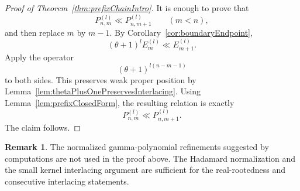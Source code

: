 \documentclass[reqno]{amsart}
\numberwithin{equation}{section}
\theoremstyle{definition}
\newtheorem{remark}[theorem]{Remark}
\begin{document}
\begin{proof}[Proof of Theorem~\ref{thm:prefixChainIntro}]
It is enough to prove that
\[
  P_{n,m}^{(l)}\ll P_{n,m+1}^{(l)}
  \qquad (m<n),
\]
and then replace $m$ by $m-1$.  By Corollary~\ref{cor:boundaryEndpoint},
\[
  (\theta+1)^lE_m^{(l)}\ll E_{m+1}^{(l)}.
\]
Apply the operator
\[
  (\theta+1)^{l(n-m-1)}
\]
to both sides.  This preserves weak proper position by
Lemma~\ref{lem:thetaPlusOnePreservesInterlacing}.  Using
Lemma~\ref{lem:prefixClosedForm}, the resulting relation is exactly
\[
  P_{n,m}^{(l)}\ll P_{n,m+1}^{(l)}.
\]
The claim follows.
\end{proof}

\begin{remark}
The normalized gamma-polynomial refinements suggested by computations are not
used in the proof above.  The Hadamard normalization and the small kernel
interlacing argument are sufficient for the real-rootedness and consecutive
interlacing statements.
\end{remark}



\end{document}
